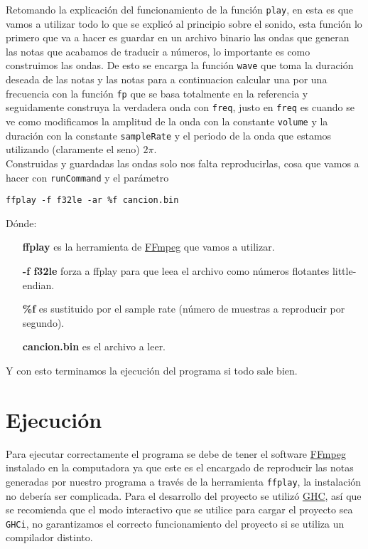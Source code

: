 \documentclass[10pt,a4paper]{article}
\begin{document}
Retomando la explicación del funcionamiento de la función \textcolor{gunaBlueLite}{\texttt{play}}, en esta es que vamos a utilizar todo lo que se explicó al principio sobre el sonido, esta función lo primero que va a hacer es guardar en un archivo binario las ondas que generan las notas que acabamos de traducir a números, lo importante es como construimos las ondas. De esto se encarga la función \textcolor{gunaBlueLite}{\texttt{wave}} que toma la duración deseada de las notas y las notas para a continuacion calcular una por una  frecuencia con la función \textcolor{gunaBlueLite}{\texttt{fp}} que se basa totalmente en la referencia\cite{formula} y seguidamente construya la verdadera onda con \textcolor{gunaBlueLite}{\texttt{freq}}, justo en \textcolor{gunaBlueLite}{\texttt{freq}} es cuando se ve como modificamos la amplitud de la onda con la constante \textcolor{gunaOrange}{\texttt{volume}} y la duración con la constante \textcolor{gunaOrange}{\texttt{sampleRate}} y el periodo de la onda que estamos utilizando (claramente el seno) $2\pi$.\\
Construidas y guardadas las ondas solo nos falta reproducirlas, cosa que vamos a hacer con \textcolor{gunaBlueLite}{\texttt{runCommand}} y el parámetro\\


\begin{center}
\texttt{ffplay -f f32le -ar \%f cancion.bin}
\end{center}
Dónde:
\begin{itemize}
\item [\textbf{ffplay}] es la herramienta de \href{https://ffmpeg.org/}{FFmpeg} que vamos a utilizar.
\item [\textbf{-f f32le}] forza a ffplay para que leea el archivo como números flotantes little-endian.
\item [\textbf{ \%f }] es sustituido por el sample rate (número de muestras a reproducir por segundo).
\item [\textbf{cancion.bin}] es el archivo a leer.
\end{itemize}

Y con esto terminamos la ejecución del programa si todo sale bien.

\section{Ejecución}
\noindent Para ejecutar correctamente el programa se debe de tener el software
\href{https://ffmpeg.org/}{FFmpeg} instalado en la computadora ya que este es el
encargado de reproducir las notas generadas por nuestro programa a través de la
herramienta \texttt{ffplay}, la instalación no debería ser complicada. Para el
desarrollo del proyecto se utilizó \href{https://www.haskell.org/ghc/}{GHC}, así
que se recomienda que el modo interactivo que se utilice para cargar el proyecto
sea \texttt{GHCi}, no garantizamos el correcto funcionamiento del proyecto si se
utiliza un compilador distinto.
\end{document}
